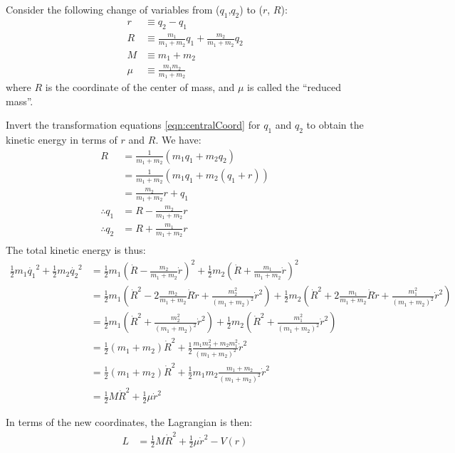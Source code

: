 Consider the following change of variables from ($q_1$,$q_2$) to ($r$, $R$):
\begin{align}
r&\equiv q_2-q_1\nonumber\\
R&\equiv \frac{m_1}{m_1+m_2}q_1+\frac{m_2}{m_1+m_2}q_2\nonumber\\
M&\equiv m_1+m_2\nonumber\\
\mu&\equiv \frac{m_1m_2}{m_1+m_2}
\label{eqn:centralCoord}
\end{align}
where $R$ is the coordinate of the center of mass, and $\mu$ is called the ``reduced mass''.
\begin{example}{0pt}{Invert the transformation equations \ref{eqn:centralCoord} for $q_1$ and $q_2$ to obtain the kinetic energy in terms of $r$ and $R$.}{}
We have:
\begin{align*}
R&=\frac{1}{m_1+m_2}(m_1q_1+m_2q_2)\nonumber\\
&=\frac{1}{m_1+m_2}(m_1q_1+m_2(q_1+r))\nonumber\\
&=\frac{m_2}{m_1+m_2}r+q_1\nonumber\\
\therefore q_1&=R-\frac{m_2}{m_1+m_2}r\nonumber\\
\therefore q_2&=R+\frac{m_1}{m_1+m_2}r\nonumber\\
\end{align*}
The total kinetic energy is thus:
\begin{align*}
\frac{1}{2}m_1\dot{q_1}^2+\frac{1}{2}m_2\dot{q_2}^2&=\frac{1}{2}m_1(\dot{R}-\frac{m_2}{m_1+m_2}\dot{r})^2+\frac{1}{2}m_2(\dot{R}+\frac{m_1}{m_1+m_2}\dot{r})^2\nonumber\\
&=\frac{1}{2}m_1(\dot{R}^2-2\frac{m_2}{m_1+m_2}\dot{R}\dot{r}+\frac{m_2^2}{(m_1+m_2)^2}\dot{r}^2)+\frac{1}{2}m_2(\dot{R}^2+2\frac{m_1}{m_1+m_2}\dot{R}\dot{r}+\frac{m_1^2}{(m_1+m_2)^2}\dot{r}^2)\nonumber\\
&=\frac{1}{2}m_1(\dot{R}^2+\frac{m_2^2}{(m_1+m_2)^2}\dot{r}^2)+\frac{1}{2}m_2(\dot{R}^2+\frac{m_1^2}{(m_1+m_2)^2}\dot{r}^2)\nonumber\\
&=\frac{1}{2}(m_1+m_2)\dot{R}^2+\frac{1}{2}\frac{m_1m_2^2+m_2m_1^2}{(m_1+m_2)^2}\dot{r}^2\nonumber\\
&=\frac{1}{2}(m_1+m_2)\dot{R}^2+\frac{1}{2}m_1m_2\frac{m_1+m_2}{(m_1+m_2)^2}\dot{r}^2\nonumber\\
&=\frac{1}{2}M\dot{R}^2+\frac{1}{2}\mu\dot{r}^2
\end{align*}
\end{example}

In terms of the new coordinates, the Lagrangian is then:
\begin{align}
L&=\frac{1}{2}M\dot{R}^2+\frac{1}{2}\mu\dot{r}^2-V(r)\nonumber\\
\end{align}

